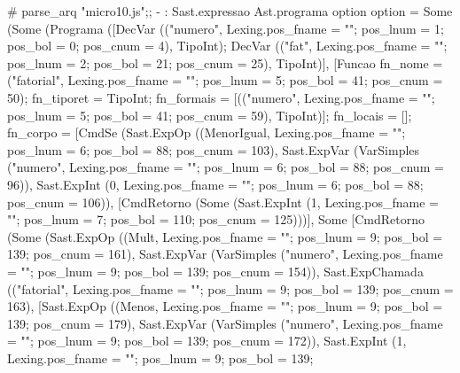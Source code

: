 \documentclass[12pt,a4paper,twoside]{article}
\begin{document}
\begin{terminal}
# parse_arq "micro10.js";;
- : Sast.expressao Ast.programa option option =
Some
 (Some
   (Programa
     ([DecVar
        (("numero",
          {Lexing.pos_fname = ""; pos_lnum = 1; pos_bol = 0; pos_cnum = 4}),
        TipoInt);
       DecVar
        (("fat",
          {Lexing.pos_fname = ""; pos_lnum = 2; pos_bol = 21; pos_cnum = 25}),
        TipoInt)],
     [Funcao
       {fn_nome =
         ("fatorial",
          {Lexing.pos_fname = ""; pos_lnum = 5; pos_bol = 41; pos_cnum = 50});
        fn_tiporet = TipoInt;
        fn_formais =
         [(("numero",
            {Lexing.pos_fname = ""; pos_lnum = 5; pos_bol = 41;
             pos_cnum = 59}),
           TipoInt)];
        fn_locais = [];
        fn_corpo =
         [CmdSe
           (Sast.ExpOp
             ((MenorIgual,
               {Lexing.pos_fname = ""; pos_lnum = 6; pos_bol = 88;
                pos_cnum = 103}),
             Sast.ExpVar
              (VarSimples
                ("numero",
                 {Lexing.pos_fname = ""; pos_lnum = 6; pos_bol = 88;
                  pos_cnum = 96})),
             Sast.ExpInt
              (0,
               {Lexing.pos_fname = ""; pos_lnum = 6; pos_bol = 88;
                pos_cnum = 106})),
           [CmdRetorno
             (Some
               (Sast.ExpInt
                 (1,
                  {Lexing.pos_fname = ""; pos_lnum = 7; pos_bol = 110;
                   pos_cnum = 125})))],
           Some
            [CmdRetorno
              (Some
                (Sast.ExpOp
                  ((Mult,
                    {Lexing.pos_fname = ""; pos_lnum = 9; pos_bol = 139;
                     pos_cnum = 161}),
                  Sast.ExpVar
                   (VarSimples
                     ("numero",
                      {Lexing.pos_fname = ""; pos_lnum = 9; pos_bol = 139;
                       pos_cnum = 154})),
                  Sast.ExpChamada
                   (("fatorial",
                     {Lexing.pos_fname = ""; pos_lnum = 9; pos_bol = 139;
                      pos_cnum = 163}),
                   [Sast.ExpOp
                     ((Menos,
                       {Lexing.pos_fname = ""; pos_lnum = 9; pos_bol = 139;
                        pos_cnum = 179}),
                     Sast.ExpVar
                      (VarSimples
                        ("numero",
                         {Lexing.pos_fname = ""; pos_lnum = 9; pos_bol = 139;
                          pos_cnum = 172})),
                     Sast.ExpInt
                      (1,
                       {Lexing.pos_fname = ""; pos_lnum = 9; pos_bol = 139;
}}
\end{terminal}
\end{document}
